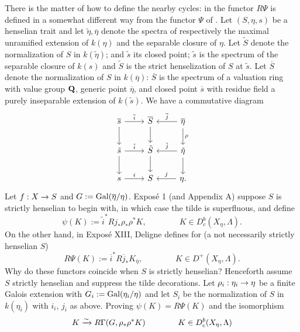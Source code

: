 \documentclass[deligne.tex]{subfiles}
\begin{document}
There is the matter of how to define the nearby cycles:
in \cite[XIII 2.1]{SGA7} the functor $R\Psi$ is defined in a somewhat 
different way from the functor $\Psi$ of \cite[I 2.2]{SGA7}.
Let $(S,\eta,s)$ be a henselian trait and let
$\tilde\eta,\overline\eta$ denote the spectra of
respectively the maximal unramified extension of $k(\eta)$ and the
separable closure of $\eta$.
Let $\tilde S$ denote the normalization of $S$ in $k(\tilde\eta)$; and
$\tilde s$ its closed point; $\tilde s$ is the spectrum of the separable
closure of $k(s)$ and $\tilde S$ is the strict henselization of $S$ at
$\tilde s$.
Let $\overline S$ denote the normalization of $S$ in $k(\overline\eta)$:
$\overline S$ is the spectrum of a valuation ring with value group $\mathbf{Q}$,
generic point $\overline\eta$, and closed point $\overline s$ with residue 
field a purely inseparable extension of $k(\tilde s)$.
We have a commutative diagram
\begin{equation*}\begin{tikzcd}
	\overline s\arrow[d]\arrow[r,"\overline i"]&
	\overline S\arrow[d]&\overline\eta\arrow[l,"\overline j"']\arrow[d,"\rho"] \\
	\tilde s\arrow[d]\arrow[r,"\tilde i"]&
	\tilde S\arrow[d]&\tilde\eta\arrow[l,"\tilde j"']\arrow[d] \\
	s\arrow[r,"i"]& S&\eta\arrow[l,"j"'].
\end{tikzcd}\end{equation*}
Let $f:X\rightarrow S$ and $G:=\operatorname{Gal}(\overline\eta/\eta)$.
Exposé 1 (and Appendix A) suppose $S$ is strictly henselian to begin with, 
in which case the tilde is superfluous, and define
\begin{equation*}
	\psi(K):=\tilde i^*Rj_*\rho_*\rho^*K,
	\qquad\qquad K\in D_c^b(X_\eta,\Lambda).
\end{equation*}
On the other hand, in Exposé XIII, Deligne defines for (a not necessarily
strictly henselian $S$)
\begin{equation*}
	R\Psi(K):=\overline i^*R\overline j_*K_{\overline\eta},
	\qquad\qquad K\in D^+(X_\eta,\Lambda).
\end{equation*}
Why do these functors coincide when $S$ is strictly henselian? Henceforth
assume $S$ strictly henselian and suppress the tilde decorations.
Let $\rho_i:\eta_i\rightarrow\eta$ be a finite Galois extension with
$G_i:=\operatorname{Gal}(\eta_i/\eta)$ and let $S_i$ be the normalization of
$S$ in $k(\eta_i)$ with $i_i$, $j_i$ as above.
Proving $\psi(K)=R\Psi(K)$ and the isomorphism
\begin{equation*}
	K\xrightarrow\sim R\Gamma(G,\rho_*\rho^*K)\qquad\qquad K\in D^b_c(X_\eta,\Lambda)
\end{equation*}
\end{document}
